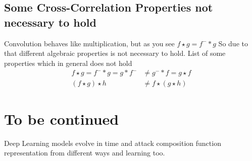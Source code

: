 \documentclass[12pt,a4paper]{article}
\theoremstyle{plain}
\begin{document}
\subsection{Some Cross-Correlation Properties not necessary to hold}
Convolution behaves like multiplication, but as you see $f \star g=f^{-}*g$
So due to that different algebraic properties is not necessary to hold.
List of some properties which in general does not hold
\begin{align}
f \star g =f^-*g = g*f^- &\ne g^-*f= g \star f\\
(f \star g) \star h &\ne f \star (g \star h)
\end{align}
\section{To be continued}
Deep Learning models evolve in time and attack composition function representation from different ways and learning too.
\end{document}
